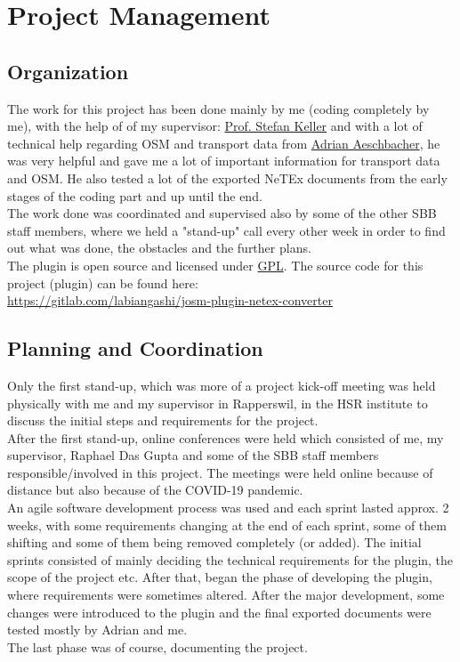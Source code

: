 \chapter{Project Management}
\section{Organization}
The work for this project has been done mainly by me (coding completely by me), with the help of of my supervisor: \href{mailto:stefan.keller@hsr.ch}{Prof. Stefan Keller} and with a lot of technical help regarding OSM and transport data from \href{mailto:adrian.aeschbacher2@sbb.ch}{Adrian Aeschbacher}, he was very helpful and gave me a lot of important information for transport data and OSM. He also tested a lot of the exported NeTEx documents from the early stages of the coding part and up until the end.\\
\newline
The work done was coordinated and supervised also by some of the other SBB staff members, where we held a "stand-up" call every other week in order to find out what was done, the obstacles and the further plans.\\
The plugin is open source and licensed under \href{https://www.gnu.org/licenses/gpl-3.0.en.html}{GPL}.
\newline
The source code for this project (plugin) can be found here:\\ \href{https://gitlab.com/labiangashi/josm-plugin-netex-converter}{https://gitlab.com/labiangashi/josm-plugin-netex-converter}
\newpage
\section{Planning and Coordination}
Only the first stand-up, which was more of a project kick-off meeting was held physically with me and my supervisor in Rapperswil, in the HSR institute to discuss the initial steps and requirements for the project.\\
After the first stand-up, online conferences were held which consisted of me, my supervisor, Raphael Das Gupta and some of the SBB staff members responsible/involved in this project. The meetings were held online because of distance but also because of the COVID-19 pandemic.\\
An agile software development process was used and each sprint lasted approx. 2 weeks, with some requirements changing at the end of each sprint, some of them shifting and some of them being removed completely (or added). The initial sprints consisted of mainly deciding the technical requirements for the plugin, the scope of the project etc. After that, began the phase of developing the plugin, where requirements were sometimes altered. After the major development, some changes were introduced to the plugin and the final exported documents were tested mostly by Adrian and me.\\
The last phase was of course, documenting the project.
